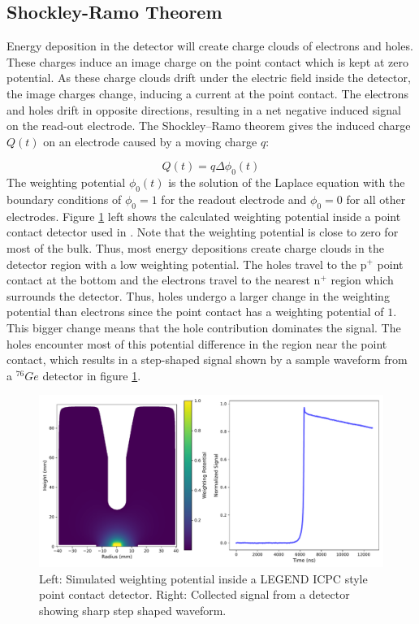 \subsection{Shockley-Ramo Theorem}
Energy deposition in the detector will create charge clouds of electrons and holes. These charges induce an image charge on the point contact which is kept at zero potential. As these charge clouds drift under the electric field inside the detector, the image charges change, inducing a current at the point contact. The electrons and holes drift in opposite directions, resulting in a net negative induced signal on the read-out electrode. The Shockley–Ramo theorem gives the induced charge $Q(t)$ on an electrode caused by a moving charge $q$:

\begin{equation}\label{wp_eq}
Q(t)=q\Delta \phi_0(t)
\end{equation}
\noindent
The weighting potential $\phi_0(t)$ is the solution of the Laplace equation with the boundary conditions of $\phi_0=1$ for the readout electrode and $\phi_0=0$ for all other electrodes. Figure \ref{fig:wp_signal} left shows the calculated weighting potential inside a point contact detector used in {\Ltwo}. Note that the weighting potential is close to zero for most of the bulk. Thus, most energy depositions create charge clouds in the detector region with a low weighting potential. The holes travel to the p$^+$ point contact at the bottom and the electrons travel to the nearest n$^+$ region which surrounds the detector. Thus, holes undergo a larger change in the weighting potential than electrons since the point contact has a weighting potential of $1$. This bigger change means that the hole contribution dominates the signal. The holes encounter most of this potential difference in the region near the point contact, which results in a step-shaped signal shown by a sample waveform from a ${}^{76}Ge$ detector in figure \ref{fig:wp_signal}.

  \begin{figure}[htb]
  \centering
  \includegraphics[trim=0 0.3cm 0 0,clip,width=\linewidth]{ch2/figs/wp_det.pdf}
  \caption{Left: Simulated weighting potential inside a LEGEND ICPC style point contact detector. Right: Collected signal from a detector showing sharp step shaped waveform.}
    \label{fig:wp_signal}
  \end{figure}

